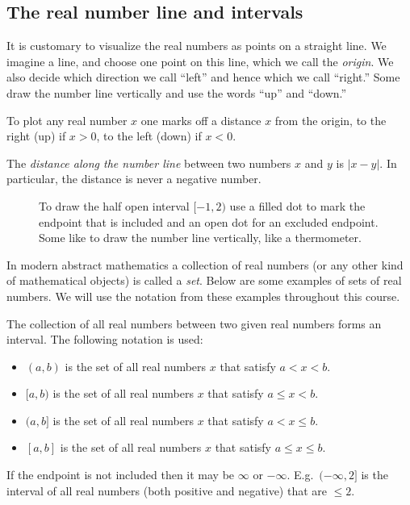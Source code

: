 \subsection{The real number line and intervals} 
It is customary to visualize the real numbers as points on a straight
line.  We imagine a line, and choose one point on this line, which we
call the \emph{origin}.  We also decide which direction we call
``left'' and hence which we call ``right.''  Some draw the number line
vertically and use the words ``up'' and ``down.''

To plot any real number $x$ one marks off a distance $x$ from the
origin, to the right (up) if $x>0$, to the left (down) if $x<0$.

The \emph{distance along the number line} between two numbers $x$ and
$y$ is $|x-y|$.  In particular, the distance is never a negative
number.

\begin{figure}[h]\centering
  
  \caption{To draw the half open interval $[-1,2)$ use a filled dot to
    mark the endpoint that is included and an open dot for an excluded
    endpoint.  Some like to draw the number line vertically, like a
    thermometer.  }
  \label{fig:01drawaninterval}
\end{figure}
\marginpar{}%

In modern abstract mathematics a collection of real numbers (or any
other kind of mathematical objects) is called a \emph{set}.  Below are
some examples of sets of real numbers.  We will use the notation from
these examples throughout this course.

The collection of all real numbers between two given real numbers forms
an interval.  The following notation is used:
\begin{itemize}
\item $(a,b)$ is the set of all real numbers $x$ that satisfy $a<x<b$.
\item $[a, b)$ is the set of all real numbers $x$ that satisfy $a\leq x<b$.
\item $(a, b]$ is the set of all real numbers $x$ that satisfy $a< x\leq b$.
\item $[a, b]$ is the set of all real numbers $x$ that satisfy $a\leq x\leq b$.
\end{itemize}
If the endpoint is not included then it may be $\infty$ or $-\infty$.
E.g.\ $(-\infty, 2]$ is the interval of all real numbers (both
positive and negative) that are $\leq 2$.

